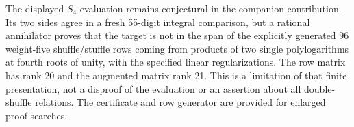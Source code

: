 \begin{remark}
The displayed $S_4$ evaluation remains conjectural in the companion
contribution. Its two sides agree in a fresh 55-digit integral
comparison, but a rational annihilator proves that the target is not in
the span of the explicitly generated 96 weight-five shuffle/stuffle
rows coming from products of two single polylogarithms at fourth roots
of unity, with the specified linear regularizations. The row matrix has
rank 20 and the augmented matrix rank 21. This is a limitation of that
finite presentation, not a disproof of the evaluation or an assertion
about all double-shuffle relations. The certificate and row generator
are provided for enlarged proof searches.
\end{remark}
